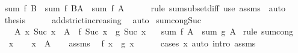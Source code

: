 \begin{isabellebody}
\ \isamarkupfalse%
\ {\isachardoublequoteopen}sum\ f\ B\ {\isacharequal}{\kern0pt}\ sum\ f\ {\isacharparenleft}{\kern0pt}B{\isacharminus}{\kern0pt}A{\isacharparenright}{\kern0pt}\ {\isacharplus}{\kern0pt}\ sum\ f\ A{\isachardoublequoteclose}\isanewline
\ \ \ \ \isamarkupfalse%
\ {\isacharparenleft}{\kern0pt}rule\ sum{\isachardot}{\kern0pt}subset{\isacharunderscore}{\kern0pt}diff{\isacharparenright}{\kern0pt}\ {\isacharparenleft}{\kern0pt}use\ assms\ \ auto{\isacharparenright}{\kern0pt}\isanewline
\ \ \isamarkupfalse%
\ \isamarkupfalse%
\ {\isacharquery}{\kern0pt}thesis\isanewline
\ \ \ \ \isamarkupfalse%
\ add{\isacharunderscore}{\kern0pt}strict{\isacharunderscore}{\kern0pt}increasing\ \isamarkupfalse%
\ auto\isanewline
{}\isamarkupfalse%
%
\endisatagproof
{\isafoldproof}%
%
\isadelimproof
\isanewline
%
\endisadelimproof
\isanewline
{}\isamarkupfalse%
\ sum{\isacharunderscore}{\kern0pt}cong{\isacharunderscore}{\kern0pt}Suc{\isacharcolon}{\kern0pt}\isanewline
\ \ \ {\isachardoublequoteopen}{}\ {\isasymnotin}\ A{\isachardoublequoteclose}\ {\isachardoublequoteopen}{\isasymAnd}x{\isachardot}{\kern0pt}\ Suc\ x\ {\isasymin}\ A\ {\isasymLongrightarrow}\ f\ {\isacharparenleft}{\kern0pt}Suc\ x{\isacharparenright}{\kern0pt}\ {\isacharequal}{\kern0pt}\ g\ {\isacharparenleft}{\kern0pt}Suc\ x{\isacharparenright}{\kern0pt}{\isachardoublequoteclose}\isanewline
\ \ \ {\isachardoublequoteopen}sum\ f\ A\ {\isacharequal}{\kern0pt}\ sum\ g\ A{\isachardoublequoteclose}\isanewline
%
\isadelimproof
%
\endisadelimproof
%
\isatagproof
{}\isamarkupfalse%
\ {\isacharparenleft}{\kern0pt}rule\ sum{\isachardot}{\kern0pt}cong{\isacharparenright}{\kern0pt}\isanewline
\ \ \isamarkupfalse%
\ x\isanewline
\ \ \isamarkupfalse%
\ {\isachardoublequoteopen}x\ {\isasymin}\ A{\isachardoublequoteclose}\isanewline
\ \ \isamarkupfalse%
\ assms{\isacharparenleft}{\kern0pt}{}{\isacharparenright}{\kern0pt}\ \isamarkupfalse%
\ {\isachardoublequoteopen}f\ x\ {\isacharequal}{\kern0pt}\ g\ x{\isachardoublequoteclose}\isanewline
\ \ \ \ \isamarkupfalse%
\ {\isacharparenleft}{\kern0pt}cases\ x{\isacharparenright}{\kern0pt}\ {\isacharparenleft}{\kern0pt}auto\ intro{\isacharbang}{\kern0pt}{\isacharcolon}{\kern0pt}\ assms{\isacharparenleft}{\kern0pt}{}{\isacharparenright}{\kern0pt}{\isacharparenright}{\kern0pt}\isanewline

\end{isabellebody}
